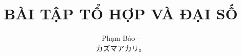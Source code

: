 \documentclass[11pt]{scrartcl}
\begin{document}
\title{\vspace{-2em}\textcolor{bk}{\textbf{BÀI TẬP TỔ HỢP VÀ ĐẠI SỐ}}}

\author{Phạm Bảo -\begin{CJK}{UTF8}{ipxm} カズマアカリ。\end{CJK}\vspace{-1em}}


\thispagestyle{empty}


\newpage
\setcounter{page}{1}
\thispagestyle{plain}
\end{document}
